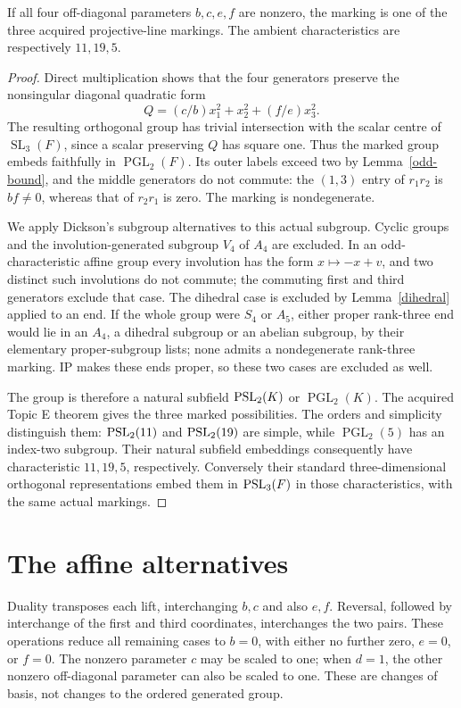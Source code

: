 \documentclass[11pt]{article}
\newcommand{\PGL}{\operatorname{PGL}}\newcommand{\SL}{\operatorname{SL}}
\begin{document}
\begin{lemma}\label{conic}
If all four off-diagonal parameters $b,c,e,f$ are nonzero, the marking
is one of the three acquired projective-line markings. The ambient
characteristics are respectively $11,19,5$.
\end{lemma}
\begin{proof}
Direct multiplication shows that the four generators preserve the
nonsingular diagonal quadratic form
\[
 Q=(c/b)x_1^2+x_2^2+(f/e)x_3^2.
\]
The resulting orthogonal group has trivial intersection with the scalar
centre of $\SL_3(F)$, since a scalar preserving $Q$ has square one.
Thus the marked group embeds faithfully in $\PGL_2(F)$. Its outer
labels exceed two by Lemma~\ref{odd-bound}, and the middle generators
do not commute: the $(1,3)$ entry of $r_1r_2$ is $bf\ne0$, whereas
that of $r_2r_1$ is zero. The marking is nondegenerate.

We apply Dickson's subgroup alternatives to this actual subgroup.
Cyclic groups and the involution-generated subgroup $V_4$ of $A_4$
are excluded. In an odd-characteristic affine group every involution
has the form $x\mapsto-x+v$, and two distinct such involutions do not
commute; the commuting first and third generators exclude that case.
The dihedral case is excluded by Lemma~\ref{dihedral} applied to an
end. If the whole group were $S_4$ or $A_5$, either proper rank-three
end would lie in an $A_4$, a dihedral subgroup or an abelian subgroup,
by their elementary proper-subgroup lists; none admits a nondegenerate
rank-three marking. IP makes these ends proper, so these two cases
are excluded as well.

The group is therefore a natural subfield $\operatorname{PSL}_2(K)$ or $\PGL_2(K)$.
The acquired Topic E theorem gives the three marked possibilities.
The orders and simplicity distinguish them: $\operatorname{PSL}_2(11)$ and
$\operatorname{PSL}_2(19)$ are simple, while $\PGL_2(5)$ has an index-two subgroup.
Their natural subfield embeddings consequently have characteristic
$11,19,5$, respectively. Conversely their standard three-dimensional
orthogonal representations embed them in $\operatorname{PSL}_3(F)$ in those
characteristics, with the same actual markings.
\end{proof}

\section*{The affine alternatives}
Duality transposes each lift, interchanging $b,c$ and also $e,f$.
Reversal, followed by interchange of the first and third coordinates,
interchanges the two pairs. These operations reduce all remaining cases
to $b=0$, with either no further zero, $e=0$, or $f=0$.
The nonzero parameter $c$ may be scaled to one; when $d=1$, the other
nonzero off-diagonal parameter can also be scaled to one. These are
changes of basis, not changes to the ordered generated group.
\end{document}
